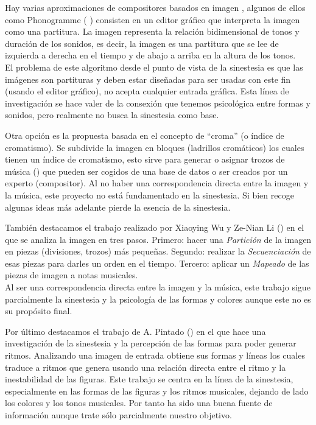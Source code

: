 Hay varias aproximaciones de compositores basados en imagen , algunos de ellos como Phonogramme (\cite{ImageBaseComposition} \cite{Phonogramme}) consisten en un editor gráfico que interpreta la imagen como una partitura. \color{blue} La imagen representa la relación bidimensional de tonos y duración de los sonidos, es decir, la imagen es una partitura que se lee de izquierda a derecha en el tiempo y de abajo a arriba en la altura de los tonos. 
\\El problema de este algoritmo desde el punto de vista de la sinestesia es que las imágenes son partituras y deben estar diseñadas para ser usadas con este fin (usando el editor gráfico), no acepta cualquier entrada gráfica. Esta línea de investigación se hace valer de la consexión que tenemos psicológica entre formas y sonidos, pero realmente no busca la sinestesia como base.\\ \color{black}

Otra opción es la propuesta basada en el concepto de ``croma'' (o índice de cromatismo). Se subdivide la imagen en bloques (ladrillos cromáticos) los cuales tienen un índice de cromatismo, esto sirve para generar o asignar trozos de música (\cite{bricksConvertsMusic}) que pueden ser cogidos de una base de datos o ser creados por un experto (compositor). \color{blue} Al no haber una correspondencia directa entre la imagen y la música, este proyecto no está fundamentado en la sinestesia. Si bien recoge algunas ideas más adelante pierde la esencia de la sinestesia.\\ \color{black}

También destacamos el trabajo realizado por Xiaoying Wu y Ze-Nian Li (\cite{ImageBaseComposition}) en el que se analiza la imagen en tres pasos. Primero: hacer una \emph{Partición} de la imagen en piezas (divisiones, trozos) más pequeñas. Segundo: realizar la \emph{Secuenciación} de esas piezas para darles un orden en el tiempo. Tercero: aplicar un \emph{Mapeado} de las piezas de imagen a notas musicales. \color{blue}
\\Al ser una correspondencia directa entre la imagen y la música, este trabajo sigue parcialmente la sinestesia y la psicología de las formas y colores aunque este no es su propósito final.\\ \color{black}

\color{blue}
Por último destacamos el trabajo de A. Pintado (\cite{portutesis}) en el que hace una investigación de la sinestesia y la percepción de las formas para poder generar ritmos. Analizando una imagen de entrada obtiene sus formas y líneas los cuales traduce a ritmos que genera usando  una relación directa entre el ritmo y la inestabilidad de las figuras. Este trabajo se centra en la línea de la sinestesia, especialmente en las formas de las figuras y los ritmos musicales, dejando de lado los colores y los tonos musicales. Por tanto ha sido una buena fuente de información aunque trate sólo parcialmente nuestro objetivo.\\ \color{black}


